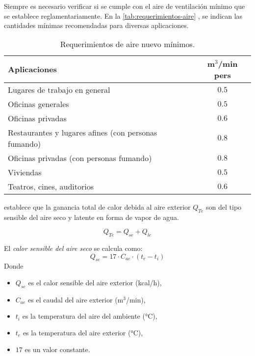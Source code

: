 Siempre es necesario verificar si se cumple con el aire de ventilación mínimo que se establece reglamentariamente. En la \autoref{tab:requerimientos-aire} \parencite{quadri2020}, se indican las cantidades mínimas recomendadas para diversas aplicaciones.

\begin{table}[h]
	\centering
	\caption{Requerimientos de aire nuevo mínimos.}
	\label{tab:requerimientos-aire}
	\begin{tabular}{lc}
		\hline
		Aplicaciones & m$^3$/min pers \\
		\hline
		Lugares de trabajo en general & $0.5$ \\
		Oficinas generales & $0.5$ \\
		Oficinas privadas & $0.6$ \\
		Restaurantes y lugares afines (con personas fumando) & $0.8$ \\
		Oficinas privadas (con personas fumando) & $0.8$ \\
		Viviendas & $0.5$ \\
		Teatros, cines, auditorios & $0.6$ \\
		\hline
	\end{tabular}
\end{table}

\textcite{quadri2020} establece que la ganancia total de calor debida al aire exterior $Q_{Te}$ son del tipo sensible del aire seco y latente en forma de vapor de agua.

\begin{equation}\label{eq:calor-aire-exterior}
	Q_{Te} = Q_{se} + Q_{le}
\end{equation}

El \emph{calor sensible del aire seco} se calcula como:
\begin{equation}
	Q_{se} = 17 \cdot C_{ae} \cdot (t_e - t_i)
\end{equation}
Donde
\begin{itemize}
	\item $Q_{se}$ es el calor sensible del aire exterior (kcal/h),
	\item $C_{ae}$ es el caudal del aire exterior (m$^3$/min),
	\item $t_i$ es la temperatura del aire del ambiente (°C),
	\item $t_e$ es la temperatura del aire exterior (°C),
	\item $17$ es un valor constante.
\end{itemize}

